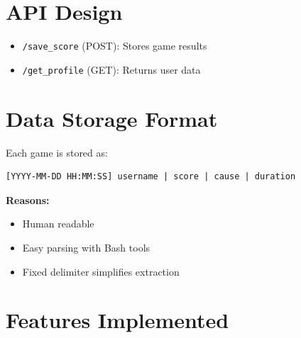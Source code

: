 \documentclass[12pt]{article}
\begin{document}
\section{API Design}

\begin{itemize}
    \item \texttt{/save\_score} (POST): Stores game results
    \item \texttt{/get\_profile} (GET): Returns user data
\end{itemize}

\section{Data Storage Format}

Each game is stored as:

\begin{verbatim}
[YYYY-MM-DD HH:MM:SS] username | score | cause | duration
\end{verbatim}

\textbf{Reasons:}
\begin{itemize}
    \item Human readable
    \item Easy parsing with Bash tools
    \item Fixed delimiter simplifies extraction
\end{itemize}

\section{Features Implemented}
\end{document}

